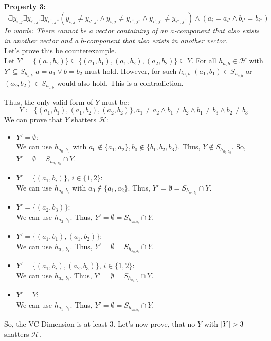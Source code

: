 \documentclass[12pt]{article}
\DeclarePairedDelimiter\abs{\lvert}{\rvert}
\begin{document}
\begin{enumerate}[label=(\alph*)]
			\textbf{Property 3:}
			$$\neg \exists y_{i, j} \exists y_{i', j'} \exists y_{i'', j''} (y_{i,j} \neq y_{i',j'} \land y_{i,j} \neq y_{i'',j''} \land y_{i',j'} \neq y_{i'',j''}) \land (a_i = a_{i'} \land b_{i'} = b_{i''})$$
			\textit{In words: There cannot be a vector containing of an $a$-component that also exists in another vector and a $b$-component that also exists in another vector.} \\
			Let's prove this be counterexample. \\
			Let $Y' = \{(a_1, b_2)\} \subseteq \{(a_1, b_1), (a_1, b_2), (a_2, b_2)\} \subseteq Y$.
			For all $h_{a,b} \in \mathcal{H}$ with $Y' \subseteq S_{h_{a,b}}$ $a=a_1 \lor b=b_2$ must hold. However, for such $h_{a,b}$ $(a_1, b_1) \in S_{h_{a,b}}$ or $(a_2, b_2) \in S_{h_{a,b}}$ would also hold. This is a contradiction.

			Thus, the only valid form of $Y$ must be:
			$$Y \coloneqq \{(a_1, b_1), (a_1, b_2), (a_2, b_2)\}, a_1 \neq a_2 \land b_1 \neq b_2 \land b_1 \neq b_3 \land b_2 \neq b_3$$
			We can prove that $Y$ shatters $\mathcal{H}$:
			\begin{itemize}
				\item	$Y' = \emptyset$: \\
						We can use $h_{a_0, b_0}$ with $a_0 \not\in \{a_1, a_2\}, b_0 \not\in \{b_1, b_2, b_3\}$. Thus, $Y \not\in S_{h_{a_0,b_0}}$. So, $Y' = \emptyset = S_{h_{a_0,b_0}} \cap Y$.
				\item	$Y' = \{(a_1, b_i)\}$, $i \in \{1,2\}$: \\
						We can use $h_{a_0, b_i}$ with $a_0 \not\in \{a_1, a_2\}$. Thus, $Y' = \emptyset = S_{h_{a_0,b_i}} \cap Y$.
				\item	$Y' = \{(a_2, b_3)\}$: \\
						We can use $h_{a_2, b_3}$. Thus, $Y' = \emptyset = S_{h_{a_0,b_i}} \cap Y$.
				\item	$Y' = \{(a_1, b_1), (a_1, b_2)\}$: \\
						We can use $h_{a_1, b_1}$. Thus, $Y' = \emptyset = S_{h_{a_0,b_i}} \cap Y$.
				\item	$Y' = \{(a_1, b_i), (a_2, b_3)\}$, $i \in \{1,2\}$: \\
						We can use $h_{a_2, b_i}$. Thus, $Y' = \emptyset = S_{h_{a_0,b_i}} \cap Y$.
				\item	$Y' = Y$: \\
						We can use $h_{a_1, b_3}$. Thus, $Y' = \emptyset = S_{h_{a_0,b_i}} \cap Y$.
			\end{itemize}
			So, the VC-Dimension is at least $3$. Let's now prove, that no $Y$ with $\abs{Y} > 3$ shatters $\mathcal{H}$.


\end{enumerate}
\end{document}
